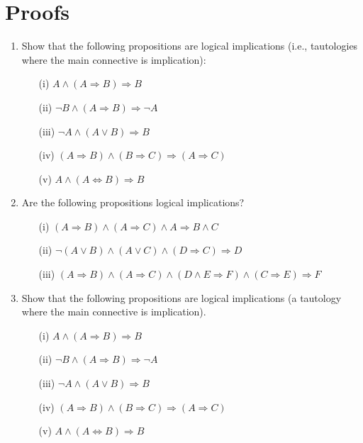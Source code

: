 \documentclass[11pt,paper=b5,footinclude,headinclude]{scrbook} %
\theoremstyle{remark}
\theoremstyle{definition} %
\theoremstyle{theorem} %
\begin{document}
\section{Proofs}
\begin{enumerate}[resume, label=\textbf{Problem \arabic*.}]
    \item Show that the following propositions are logical implications (i.e., tautologies where the main connective is implication):
        \begin{itemize}
            \item[(i)] $A \land (A \Rightarrow B) \Rightarrow B$
            \item[(ii)] $\neg B \land (A \Rightarrow B) \Rightarrow \neg A$
            \item[(iii)] $\neg A \land (A \lor B) \Rightarrow B$
            \item[(iv)] $(A \Rightarrow B) \land (B \Rightarrow C) \Rightarrow (A \Rightarrow C)$
            \item[(v)] $A \land (A \Leftrightarrow B) \Rightarrow B$
        \end{itemize}
    \item Are the following propositions logical implications?
\begin{itemize}
    \item[(i)] $(A \Rightarrow B) \land (A \Rightarrow C) \land A \Rightarrow B \land C$
    \item[(ii)] $\neg(A \lor B) \land (A \lor C) \land (D \Rightarrow C) \Rightarrow D$
    \item[(iii)] $(A \Rightarrow B) \land (A \Rightarrow C) \land (D \land E \Rightarrow F) \land (C \Rightarrow E) \Rightarrow F$
\end{itemize}



\item Show that the following propositions are logical implications (a tautology where the main connective is implication).
\begin{enumerate}
\item[(i)] $A \wedge (A \Rightarrow B) \Rightarrow B$
\item[(ii)] $\neg B \wedge (A \Rightarrow B) \Rightarrow \neg A$
\item[(iii)] $\neg A \wedge (A \vee B) \Rightarrow B$
\item[(iv)] $(A \Rightarrow B) \wedge (B \Rightarrow C) \Rightarrow (A \Rightarrow C)$
\item[(v)] $A \wedge (A \Leftrightarrow B) \Rightarrow B$
\end{enumerate}


\end{enumerate}
\end{document}
